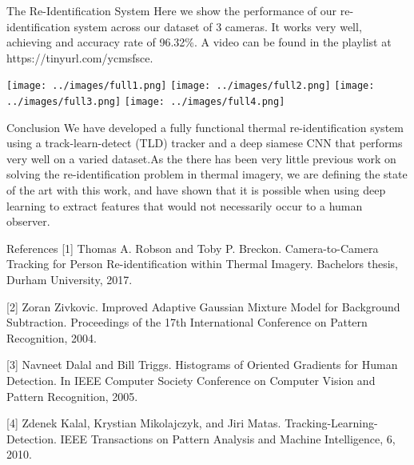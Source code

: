 \documentclass[final]{beamer}
\begin{document}
\begin{frame}{}
\begin{columns}[t]
\begin{column}{.5\linewidth}
        \begin{block}{The Re-Identification System}
        Here we show the performance of our re-identification system across our dataset of 3 cameras. It works very well, achieving and accuracy rate of 96.32\%. A video can be found in the playlist at https://tinyurl.com/ycmsfsce.
       
 		\texttt{[image: ../images/full1.png]}  
 		\vspace{.05cm}
 		\texttt{[image: ../images/full2.png]}
 		\vspace{.05cm}
        \texttt{[image: ../images/full3.png]} 
        \vspace{.05cm}
        \texttt{[image: ../images/full4.png]} 
        \end{block}
        
       	\begin{block}{Conclusion}
		We have developed a fully functional thermal re-identification system using a track-learn-detect (TLD) tracker and a deep siamese CNN that performs very well on a varied dataset.As the there has been very little previous work on solving the re-identification problem in thermal imagery, we are defining the state of the art with this work, and have shown that it is possible when using deep learning to extract features that would not necessarily occur to a human observer.
        
        \end{block}
        
        \begin{block}{References}
		\small
[1] Thomas A. Robson and Toby P. Breckon. Camera-to-Camera Tracking for Person Re-identification within Thermal Imagery. Bachelors thesis, Durham University, 2017.

[2] Zoran Zivkovic. Improved Adaptive Gaussian Mixture Model for Background Subtraction. Proceedings of the 17th International Conference on Pattern Recognition, 2004.
    
[3] Navneet Dalal and Bill Triggs. Histograms of Oriented Gradients for Human Detection. In IEEE Computer Society Conference on Computer Vision and Pattern Recognition, 2005.

[4] Zdenek Kalal, Krystian Mikolajczyk, and Jiri Matas. Tracking-Learning-Detection. IEEE Transactions on Pattern Analysis and Machine Intelligence, 6, 2010.
		
    \end{block}

      \end{column}
    \end{columns}
     

  \end{frame}
\end{document}

